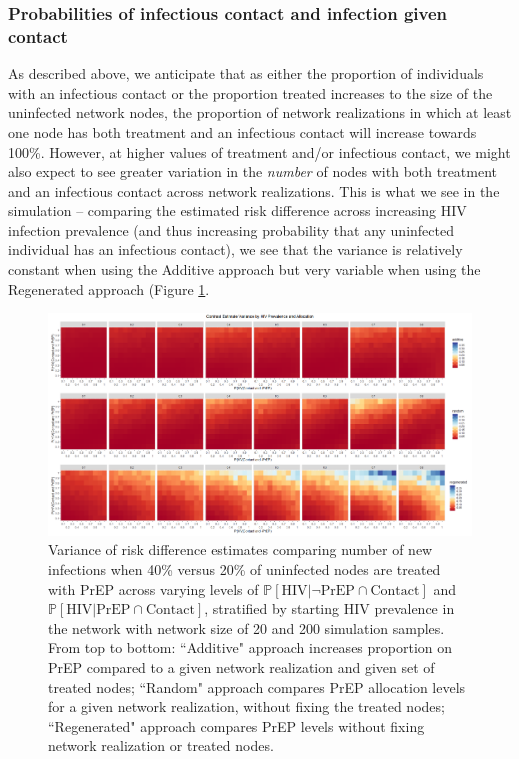 \documentclass{article}
\theoremstyle{definition}
\begin{document}
\subsubsection{Probabilities of infectious contact and infection given contact}
As described above, we anticipate that as either the proportion of individuals with an infectious contact or the proportion treated increases to the size of the uninfected network nodes, the proportion of network realizations in which at least one node has both treatment and an infectious contact will increase towards 100\%. However, at higher values of treatment and/or infectious contact, we might also expect to see greater variation in the \textit{number} of nodes with both treatment and an infectious contact across network realizations. This is what we see in the simulation -- comparing the estimated risk difference across increasing HIV infection prevalence (and thus increasing probability that any uninfected individual has an infectious contact), we see that the variance is relatively constant when using the Additive approach but very variable when using the Regenerated approach (Figure \ref{fig:Figure 10}.


\begin{figure}[H]
    \centering
    \includegraphics[width=\linewidth]{Figures/HIV Prevalence Variance plots.png}
    \caption{Variance of risk difference estimates comparing number of new infections when 40\% versus 20\% of uninfected nodes are treated with PrEP across varying levels of $\mathbb{P}\left[\text{HIV} \vert \neg \text{PrEP} \cap \text{Contact}\right]$ and $\mathbb{P}\left[\text{HIV} \vert \text{PrEP} \cap \text{Contact}\right]$, stratified by starting HIV prevalence in the network with network size of 20 and 200 simulation samples.
    From top to bottom: ``Additive" approach increases proportion on PrEP compared to a given network realization and given set of treated nodes; ``Random" approach compares PrEP allocation levels for a given network realization, without fixing the treated nodes; ``Regenerated" approach compares PrEP levels without fixing network realization or treated nodes.}
    \label{fig:Figure 10}
\end{figure}
\end{document}
